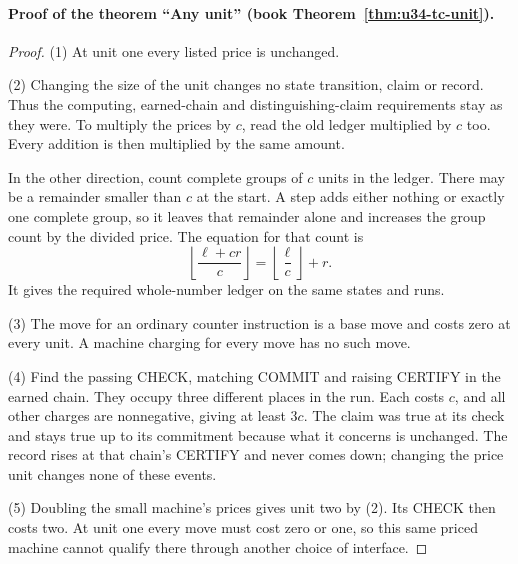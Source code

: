 \documentclass[11pt,twoside]{article}
\theoremstyle{thielethm}
\theoremstyle{thieledef}
\theoremstyle{thieledef}
\theoremstyle{thieledef}
\theoremstyle{thielethm}
\theoremstyle{thieleobs}
\theoremstyle{thielethm}
\begin{document}
\paragraph{Proof of the theorem ``Any unit'' (book Theorem~\ref{thm:u34-tc-unit}).}
\begin{proof}
(1) At unit one every listed price is unchanged.

(2) Changing the size of the unit changes no state transition, claim or
record. Thus the computing, earned-chain and distinguishing-claim requirements
stay as they were. To multiply the prices by $c$, read the old ledger
multiplied by $c$ too. Every addition is then multiplied by the same amount.

In the other direction, count complete groups of $c$ units in the ledger.
There may be a remainder smaller than $c$ at the start. A step adds either
nothing or exactly one complete group, so it leaves that remainder alone
and increases the group count by the divided price. The equation for that
count is
\[
 \left\lfloor\frac{\ell+cr}{c}\right\rfloor
 =\left\lfloor\frac{\ell}{c}\right\rfloor+r.
\]
It gives the required whole-number ledger on the same states and runs.

(3) The move for an ordinary counter instruction is a base move and costs
zero at every unit. A machine charging for every move has no such move.

(4) Find the passing CHECK, matching COMMIT and raising CERTIFY in the earned
chain. They occupy three different places in the run. Each costs $c$, and
all other charges are nonnegative, giving at least $3c$. The claim was true
at its check and stays true up to its commitment because what it concerns
is unchanged. The record rises at that chain's CERTIFY and never comes down;
changing the price unit changes none of these events.

(5) Doubling the small machine's prices gives unit two by (2). Its CHECK
then costs two. At unit one every move must cost zero or one, so this same
priced machine cannot qualify there through another choice of interface.
\end{proof}
\end{document}

